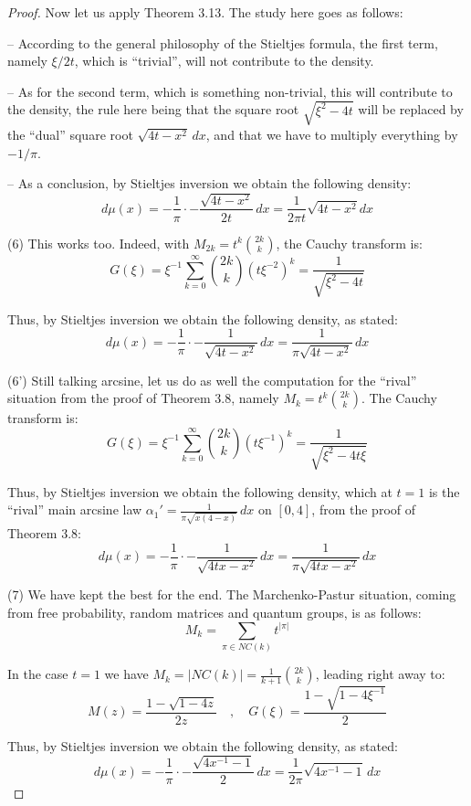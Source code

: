 \documentclass[12pt]{amsbook}
\begin{document}
\begin{proof}
Now let us apply Theorem 3.13. The study here goes as follows:

\medskip

-- According to the general philosophy of the Stieltjes formula, the first term, namely $\xi/2t$, which is ``trivial'', will not contribute to the density. 

\medskip

-- As for the second term, which is something non-trivial, this will contribute to the density, the rule here being that the square root $\sqrt{\xi^2-4t}$ will be replaced by the ``dual'' square root $\sqrt{4t-x^2}\,dx$, and that we have to multiply everything by $-1/\pi$. 

\medskip

-- As a conclusion, by Stieltjes inversion we obtain the following density:
$$d\mu(x)
=-\frac{1}{\pi}\cdot-\frac{\sqrt{4t-x^2}}{2t}\,dx
=\frac{1}{2\pi t}\sqrt{4t-x^2}dx$$

(6) This works too. Indeed, with $M_{2k}=t^k\binom{2k}{k}$, the Cauchy transform is:
$$G(\xi)
=\xi^{-1}\sum_{k=0}^\infty\binom{2k}{k}(t\xi^{-2})^k
=\frac{1}{\sqrt{\xi^2-4t}}$$

Thus, by Stieltjes inversion we obtain the following density, as stated:
$$d\mu(x)
=-\frac{1}{\pi}\cdot-\frac{1}{\sqrt{4t-x^2}}\,dx
=\frac{1}{\pi\sqrt{4t-x^2}}\,dx$$

(6') Still talking arcsine, let us do as well the computation for the ``rival'' situation from the proof of Theorem 3.8, namely $M_k=t^k\binom{2k}{k}$. The Cauchy transform is:
$$G(\xi)
=\xi^{-1}\sum_{k=0}^\infty\binom{2k}{k}(t\xi^{-1})^k
=\frac{1}{\sqrt{\xi^2-4t\xi}}$$

Thus, by Stieltjes inversion we obtain the following density, which at $t=1$ is the ``rival'' main arcsine law $\alpha_1'=\frac{1}{\pi\sqrt{x(4-x)}}\,dx$ on $[0,4]$, from the proof of Theorem 3.8:
$$d\mu(x)
=-\frac{1}{\pi}\cdot-\frac{1}{\sqrt{4tx-x^2}}\,dx
=\frac{1}{\pi\sqrt{4tx-x^2}}\,dx$$

(7) We have kept the best for the end. The Marchenko-Pastur situation, coming from free probability, random matrices and quantum groups, is as follows:
$$M_k=\sum_{\pi\in NC(k)}t^{|\pi|}$$

In the case $t=1$ we have $M_k=|NC(k)|=\frac{1}{k+1}\binom{2k}{k}$, leading right away to:
$$M(z)=\frac{1-\sqrt{1-4z}}{2z}\quad ,\quad G(\xi)=\frac{1-\sqrt{1-4\xi^{-1}}}{2}$$

Thus, by Stieltjes inversion we obtain the following density, as stated:
$$d\mu(x)
=-\frac{1}{\pi}\cdot-\frac{\sqrt{4x^{-1}-1}}{2}\,dx
=\frac{1}{2\pi}\sqrt{4x^{-1}-1}\,dx$$


\end{proof}
\end{document}
